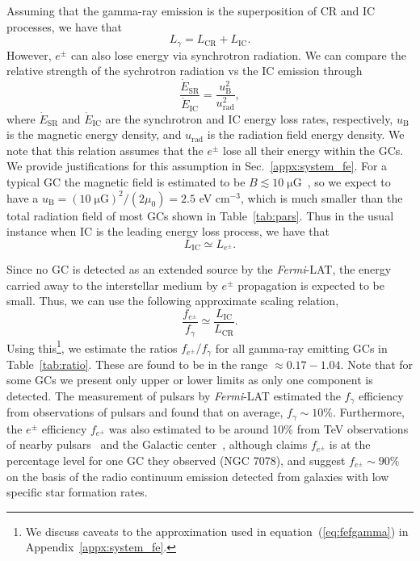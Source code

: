 \documentclass[doublespace,nopageskip]{VTthesis} %
\begin{document}
Assuming that the gamma-ray emission is the superposition of CR and IC processes, we have that
\begin{equation}
    L_\gamma = L_\mathrm{CR} + L_\mathrm{IC}.
\end{equation}
However, $e^\pm$ can also lose energy via synchrotron radiation. We can compare the relative strength of the sychrotron radiation vs the IC emission through
\begin{equation}
    \frac{\dot{E}_\mathrm{SR}}{\dot{E}_\mathrm{IC}} = \frac{u_\mathrm{B}^2}{u_\mathrm{rad}^2},
\end{equation}
where $\dot{E}_\mathrm{SR}$ and $\dot{E}_\mathrm{IC}$ are the synchrotron and IC energy loss rates, respectively, $u_\mathrm{B}$ is the magnetic energy density, and $u_\mathrm{rad}$ is the radiation field energy density. We note that this relation assumes that the $e^\pm$ lose all their energy within the GCs. We provide justifications for this assumption in Sec.~\ref{appx:system_fe}. For a typical GC the magnetic field is estimated to be $B\lesssim \mathrm{10\;\mu G}$~\citep{2007MNRAS.377..920B}, so we expect to have a $u_\mathrm{B} = {\mathrm{(10\;\mu G)}^2}/{(2\mu_0)} = 2.5$ eV cm$^{-3}$, which is much smaller than the total radiation field of most GCs shown in Table~\ref{tab:pars}. Thus in the usual instance when IC is the leading energy loss process, we have that
\begin{equation}
    L_\mathrm{IC} \simeq L_{e^\pm}.
\end{equation}

Since no GC is detected as an extended source by the \textit{Fermi}-LAT, the energy carried away to the interstellar medium by $e^\pm$ propagation is expected to be small. Thus, we can use the following approximate scaling relation,
\begin{equation}\label{eq:fefgamma}
    \dfrac{f_{e^\pm}}{f_\gamma} \simeq \dfrac{L_\mathrm{IC}}{L_\mathrm{CR}}.
\end{equation}
Using this\footnote{We discuss caveats to the approximation used in equation~(\ref{eq:fefgamma}) in Appendix~\ref{appx:system_fe}.}, we estimate the ratios $f_{e^\pm}/f_\gamma$ for all gamma-ray emitting GCs in Table~\ref{tab:ratio}. These are found to be in the range $\approx 0.17 - 1.04$. Note that for some GCs we present only upper or lower limits as only one component is detected. The measurement of pulsars by \textit{Fermi}-LAT estimated the $f_{\gamma}$ efficiency from observations of pulsars and found that on average, $f_\gamma \sim \mathrm{10\%}$. Furthermore, the $e^\pm$ efficiency $f_{e^\pm}$ was also estimated to be around 10\% from TeV observations of {nearby pulsars~\citep{2017PhRvD..96j3013H, 2018PhRvD..98d3005H, 2021arXiv210400014H} and} the Galactic center~\citep{2013MNRAS.435L..14B}, although \citet{2019MNRAS.484.2876M} claims $f_{e^\pm}$ is at the percentage level for one GC they observed (NGC 7078), and \citet{2020arXiv200508982S} suggest $f_{e^\pm} \sim 90\%$ on the basis of the  radio continuum emission detected from galaxies with low specific star formation rates.
\end{document}
